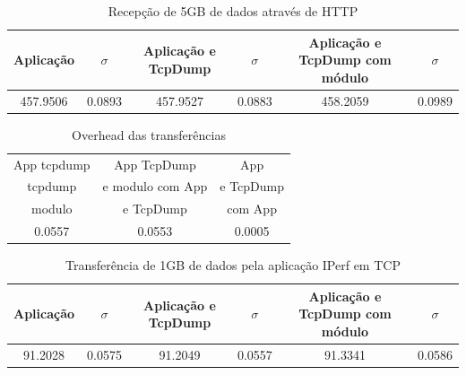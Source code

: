 \documentclass[a4paper]{llncs}
\begin{document}
\begin{table}
\begin{center}
\caption{Recepção de 5GB de dados através de HTTP}
\begin{tabular}{ | c | c | c |c | c | c | }
\hline
Aplicação & $\sigma$ & Aplicação e TcpDump & $\sigma$ & Aplicação e TcpDump com módulo &  $\sigma$ \\
\hline
457.9506 & 0.0893 &
457.9527 & 0.0883 &
458.2059 & 0.0989 \\
\hline
\end{tabular}
\end{center}
\end{table}


\begin{table}
\begin{center}
\caption{Overhead das transferências}
\begin{tabular}{ | c | c | c  | }
\hline
\hspace {1cm} App tcpdump \hspace {1cm}  & \hspace{1cm} App TcpDump  \hspace{1cm} & \hspace{1cm} App \hspace{1cm}  \\
tcpdump & e modulo com App & e TcpDump\\
modulo & e TcpDump & com App \\
\hline
0.0557 &
0.0553 &
0.0005\\
\hline
\end{tabular}
\end{center}
\end{table}
%
%

\begin{table}
\begin{center}
\caption{Transferência de 1GB de dados pela aplicação IPerf em TCP}
\begin{tabular}{ | c | c | c |c | c | c | }
\hline
Aplicação & $\sigma$ & Aplicação e TcpDump & $\sigma$ & Aplicação e TcpDump com módulo &  $\sigma$ \\
\hline
91.2028	& 0.0575 &
91.2049	& 0.0557 & 
91.3341	& 0.0586  \\
\hline
\end{tabular}
\end{center}
\end{table}
\end{document}
